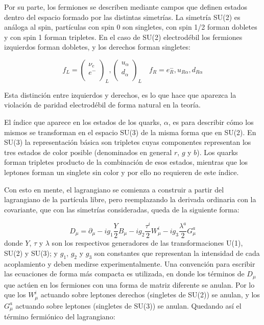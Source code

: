 Por su parte, los fermiones se describen mediante campos que definen estados dentro del espacio formado por las distintas simetrías. La simetría SU(2) es análoga al spin, partículas con spin 0 son singletes, con spin 1/2 forman dobletes y con spin 1 forman tripletes. En el caso de SU(2) electrodébil los fermiones izquierdos forman dobletes, y los derechos forman singletes:

\begin{equation}
	f_L = 
	\begin{pmatrix}
	\nu_{e} \\
	e^{-} \\
	\end{pmatrix}_{L},
	\begin{pmatrix}
	u_\alpha \\
	d_\alpha \\
	\end{pmatrix}_{L}
	\quad
	f_R = e^{-}_{R},u_{R\alpha},d_{R\alpha}
\end{equation}

Esta distinción entre izquierdos y derechos, es lo que hace que aparezca la violación de paridad electrodébil de forma natural en la teoría.

El índice que aparece en los estados de los quarks, $\alpha$, es para describir cómo los mismos se transforman en el espacio SU(3) de la misma forma que en SU(2). En SU(3) la representación básica son tripletes cuyas componentes representan los tres estados de color posible (denominados en general $r$, $g$ y $b$). Los quarks forman tripletes producto de la combinación de esos estados, mientras que los leptones forman un singlete sin color y por ello no requieren de este índice.

Con esto en mente, el lagrangiano se comienza a construir a partir del lagrangiano de la partícula libre, pero reemplazando la derivada ordinaria con la covariante, que con las simetrías consideradas, queda de la siguiente forma:


\begin{equation}
D_{\mu} = \partial_{\mu} - i g_{1} \frac{Y}{2}B_{\mu} - i g_{2} \frac{\tau^{i}}{2}W_{\mu}^{i} - i g_{3} \frac{\lambda^{a}}{2}G_{\mu}^{a}
\end{equation}
%
donde $Y$, $\tau$ y $\lambda$ son los respectivos generadores de las transformaciones U(1), SU(2) y SU(3); y $g_1$, $g_2$ y $g_3$ son constantes que representan la intensidad de cada acoplamiento y deben medirse experimentalmente. Una convención para escribir las ecuaciones de forma más compacta es utilizada, en donde los términos de $D_{\mu}$ que actúen en los fermiones con una forma de matriz diferente se anulan. Por lo que los $W_{\mu}^{i}$ actuando sobre leptones derechos (singletes de SU(2)) se anulan, y los $G_{\mu}^{a}$ actuando sobre leptones (singletes de SU(3)) se anulan. Quedando así el término fermiónico del lagrangiano:

